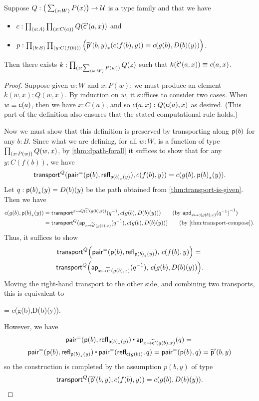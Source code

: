 \begin{lem}\label{thm:flattening-rect}
  Suppose $Q:\big(\sm{x:W} P(x)\big) \to \type$ is a type family and that we have
  \begin{itemize}
  \item $c : \prd{a:A}{x:C(a)} Q(\cct'(a,x))$ and
  \item $p : \prd{b:B}{y:C(f(b))} \Big(\trans{\ppt'(b,y)}{c(f(b),y)} = c(g(b),D(b)(y))\Big)$. %
  \end{itemize}
  Then there exists $k:\prd{z:\sm{w:W} P(w)} Q(z)$ such that $k(\widetilde{\mathsf{c}}'(a,x)) \equiv c(a,x)$.
\end{lem}
\begin{proof}
  Suppose given $w:W$ and $x:P(w)$; we must produce an element $k(w,x):Q(w,x)$.
  By induction on $w$, it suffices to consider two cases.
  When $w\equiv \mathsf{c}(a)$, then we have $x:C(a)$, and so $c(a,x):Q(\mathsf{c}(a),x)$ as desired.
  (This part of the definition also ensures that the stated computational rule holds.)

  Now we must show that this definition is preserved by transporting along $\mathsf{p}(b)$ for any $b:B$.
  Since what we are defining, for all $w:W$, is a function of type $\prd{x:P(w)} Q(w,x)$, by \cref{thm:dpath-forall} it suffices to show that for any $y:C(f(b))$, we have
  \[ \mathsf{transport}^{Q}(\mathsf{pair}^{\mathord{=}}(\mathsf{p}(b),\mathsf{refl}_{{\mathsf{p}(b)}_{*}\mathopen{}\left({y}\right)\mathclose{}}),c(f(b),y)) = c(g(b),{\mathsf{p}(b)}_{*}\mathopen{}\left({y}\right)\mathclose{}). \]
  Let $q:{\mathsf{p}(b)}_{*}\mathopen{}\left({y}\right)\mathclose{} = D(b)(y)$ be the path obtained from \cref{thm:transport-is-given}.
  Then we have
  \begin{align}
    c(g(b),\trans{\pp(b)}{y})
    &= \transfib{x\mapsto Q(\cct'(g(b),x))}{\opp{q}}{c(g(b),D(b)(y))}
    \tag{by $\opp{\apdfunc{x\mapsto c(g(b),x)}(\opp q)}$} \\
    &= \transfib{Q}{\apfunc{x\mapsto \cct'(g(b),x)}(\opp q)}{c(g(b),D(b)(y))}
    \tag{by \cref{thm:transport-compose}}.
  \end{align}
  Thus, it suffices to show
  \begin{multline*}
    \mathsf{transport}^{Q}\Big(\mathsf{pair}^{\mathord{=}}(\mathsf{p}(b),\mathsf{refl}_{{\mathsf{p}(b)}_{*}\mathopen{}\left({y}\right)\mathclose{}}),\, c(f(b),y)\Big) = {}\\
    \mathsf{transport}^{Q}\Big(\mathsf{ap}_{x\mapsto \widetilde{\mathsf{c}}'(g(b),x)}(\mathord{{q}^{-1}}),\, c(g(b),D(b)(y))\Big).
  \end{multline*}
  Moving the right-hand transport to the other side, and combining two transports, this is equivalent to
  \begin{narrowmultline*}
     =
    \narrowbreak
    c(g(b),D(b)(y)).
  \end{narrowmultline*}
  However, we have
  \begin{multline*}
    \pairpath(\pp(b),\refl{\trans{\pp(b)}{y}}) \ct \apfunc{x\mapsto \cct'(g(b),x)}(q)
    = {} \\
    \pairpath(\pp(b),\refl{\trans{\pp(b)}{y}}) \ct \pairpath(\refl{\cc(g(b))},q)
    = \pairpath(\pp(b),q)
    = \ppt'(b,y)
  \end{multline*}
  so the construction is completed by the assumption $p(b,y)$ of type
  \[ \mathsf{transport}^{Q}(\widetilde{\mathsf{p}}'(b,y),c(f(b),y)) = c(g(b),D(b)(y)). \qedhere \]
\end{proof}

